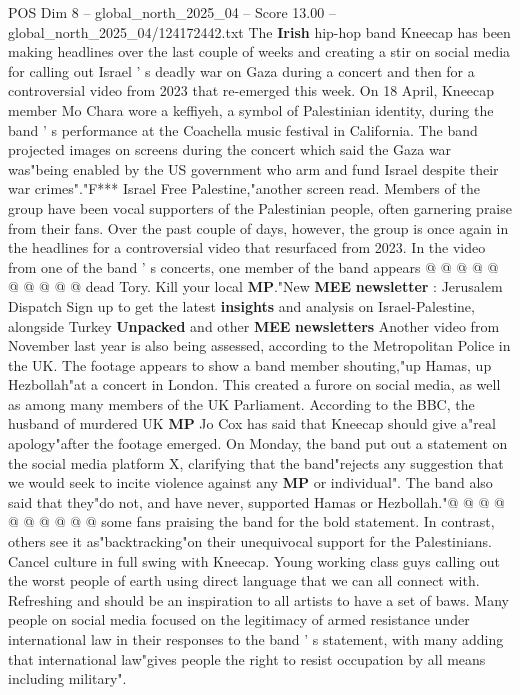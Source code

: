 \begin{textsample}{POS Dim 8 – global\_north\_2025\_04 – Score 13.00 – global\_north\_2025\_04/124172442.txt}  \label{ex:f8_pos_029}
The \textbf{Irish} hip-hop band Kneecap has been making headlines over the last couple of weeks and creating a stir on social media for calling out Israel ' s deadly war on Gaza during a concert and then for a controversial video from 2023 that re-emerged this week.
On 18 April, Kneecap member Mo Chara wore a keffiyeh, a symbol of Palestinian identity, during the band ' s performance at the Coachella music festival in California.
The band projected images on screens during the concert which said the Gaza war was"being enabled by the US government who arm and fund Israel despite their war crimes"."F*** Israel Free Palestine,"another screen read.
Members of the group have been vocal supporters of the Palestinian people, often garnering praise from their fans.
Over the past couple of days, however, the group is once again in the headlines for a controversial video that resurfaced from 2023.
In the video from one of the band ' s concerts, one member of the band appears @ @ @ @ @ @ @ @ @ @ dead Tory.
Kill your local \textbf{MP}."New \textbf{MEE} \textbf{newsletter} : Jerusalem Dispatch Sign up to get the latest \textbf{insights} and analysis on Israel-Palestine, alongside Turkey \textbf{Unpacked} and other \textbf{MEE} \textbf{newsletters} Another video from November last year is also being assessed, according to the Metropolitan Police in the UK.
The footage appears to show a band member shouting,"up Hamas, up Hezbollah"at a concert in London.
This created a furore on social media, as well as among many members of the UK Parliament.
According to the BBC, the husband of murdered UK \textbf{MP} Jo Cox has said that Kneecap should give a"real apology"after the footage emerged.
On Monday, the band put out a statement on the social media platform X, clarifying that the band"rejects any suggestion that we would seek to incite violence against any \textbf{MP} or individual".
The band also said that they"do not, and have never, supported Hamas or Hezbollah."@ @ @ @ @ @ @ @ @ @ some fans praising the band for the bold statement.
In contrast, others see it as"backtracking"on their unequivocal support for the Palestinians.
Cancel culture in full swing with Kneecap.
Young working class guys calling out the worst people of earth using direct language that we can all connect with.
Refreshing and should be an inspiration to all artists to have a set of baws.
Many people on social media focused on the legitimacy of armed resistance under international law in their responses to the band ' s statement, with many adding that international law"gives people the right to resist occupation by all means including military".

\end{textsample}
